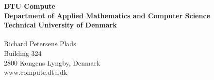 \thispagestyle{empty} %
\frieze
\vspace*{\fill}
\noindent
\sffamily
\small
\textbf{DTU Compute}\\
\textbf{Department of Applied Mathematics and Computer Science}\\
\textbf{Technical University of Denmark}\\
\\
Richard Petersens Plads\\
Building 324\\
2800 Kongens Lyngby, Denmark\\
www.compute.dtu.dk\\
\normalsize
\normalfont
\vspace*{2.5cm}

